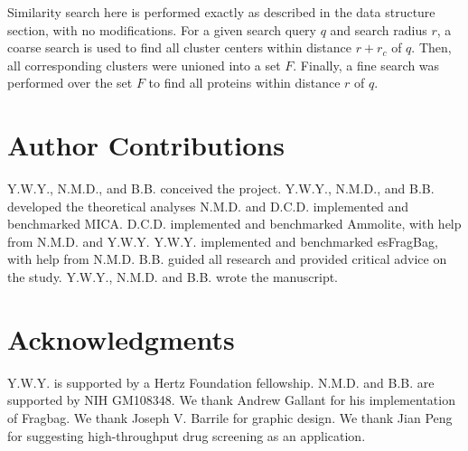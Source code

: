 \documentclass[review,preprint,12pt]{elsarticle}
\theoremstyle{definition}
\theoremstyle{remark}
\numberwithin{equation}{section}
\begin{document}
Similarity search here is performed exactly as described in the data structure section, with no modifications.
For a given search query $q$ and search radius $r$,
a coarse search is used to find all cluster centers within distance $r+r_c$ of $q$.
Then, all corresponding clusters were unioned into a set $F$.
Finally, a fine search was performed over the set $F$ to find all proteins within distance $r$ of $q$.

\section{Author Contributions}
Y.W.Y., N.M.D., and B.B. conceived the project.
Y.W.Y., N.M.D., and B.B. developed the theoretical analyses
N.M.D. and D.C.D. implemented and benchmarked MICA.
D.C.D. implemented and benchmarked Ammolite, with help from N.M.D. and Y.W.Y.
Y.W.Y. implemented and benchmarked esFragBag, with help from N.M.D.
B.B. guided all research and provided critical advice on the study.
Y.W.Y., N.M.D. and B.B. wrote the manuscript.

\section{Acknowledgments}
Y.W.Y. is supported by a Hertz Foundation fellowship.
N.M.D. and B.B. are supported by NIH GM108348.
We thank Andrew Gallant for his implementation of Fragbag.
We thank Joseph V. Barrile for graphic design.
We thank Jian Peng for suggesting high-throughput drug screening as an application.


%

\end{document}
